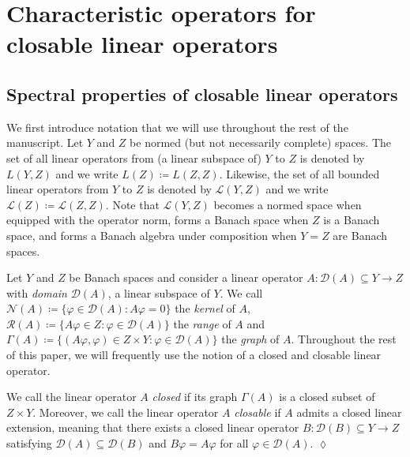 \documentclass[english]{myarticle}
\begin{document}
\begin{sloppypar}
\section{Characteristic operators for closable linear operators} \label{sec:characoperators}

\subsection{Spectral properties of closable linear operators} \label{subsec:spectralprop}
We first introduce notation that we will use throughout the rest of the manuscript. Let $Y$ and $Z$ be normed (but not necessarily complete) spaces. The set of all linear operators from (a linear subspace of) $Y$ to $Z$ is denoted by $L(Y,Z)$ and we write $L(Z) \coloneqq L(Z,Z)$. Likewise, the set of all bounded linear operators from $Y$ to $Z$ is denoted by $\mathcal{L}(Y,Z)$ and we write $\mathcal{L}(Z) \coloneqq \mathcal{L}(Z,Z)$. Note that $\mathcal{L}(Y,Z)$ becomes a normed space when equipped with the operator norm, forms a Banach space when $Z$ is a Banach space, and forms a Banach algebra under composition when $Y=Z$ are Banach spaces.

Let $Y$ and $Z$ be Banach spaces and consider a linear operator $A: \mathcal{D}(A) \subseteq Y \to Z$ with \emph{domain} $\mathcal{D}(A)$, a linear subspace of $Y$. We call $\mathcal{N}(A) \coloneqq \{ \varphi \in \mathcal{D}(A) : A \varphi = 0 \}$ the \emph{kernel} of $A$, $\mathcal{R}(A) \coloneqq \{ A\varphi \in Z : \varphi \in \mathcal{D}(A) \}$ the \emph{range} of $A$ and $\Gamma(A) \coloneqq \{ (A\varphi, \varphi) \in Z \times Y : \varphi \in \mathcal{D}(A) \}$ the \emph{graph} of $A$. Throughout the rest of this paper, we will frequently use the notion of a closed and closable linear operator.

\begin{definition} \label{def:closedandclosable}
We call the linear operator $A$ \emph{closed} if its graph $\Gamma(A)$ is a closed subset of $Z \times Y$. Moreover, we call the linear operator $A$ \emph{closable} if $A$ admits a closed linear extension, meaning that there exists a closed linear operator $B : \mathcal{D}(B) \subseteq Y \to Z$ satisfying $\mathcal{D}(A) \subseteq \mathcal{D}(B)$ and $B \varphi = A \varphi$ for all $\varphi \in \mathcal{D}(A)$. \hfill $\lozenge$
\end{definition}


\end{sloppypar}
\end{document}
